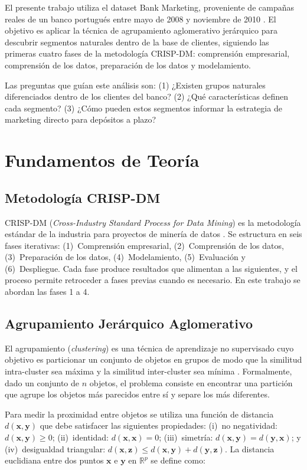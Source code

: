 \documentclass[10pt,a4paper]{article}
\begin{document}
El presente trabajo utiliza el dataset Bank Marketing, proveniente de campañas reales de un banco portugués entre mayo de 2008 y noviembre de 2010 \citep{moro2011}. El objetivo es aplicar la técnica de agrupamiento aglomerativo jerárquico para descubrir segmentos naturales dentro de la base de clientes, siguiendo las primeras cuatro fases de la metodología CRISP-DM: comprensión empresarial, comprensión de los datos, preparación de los datos y modelamiento.

Las preguntas que guían este análisis son: (1) ¿Existen grupos naturales diferenciados dentro de los clientes del banco? (2) ¿Qué características definen cada segmento? (3) ¿Cómo pueden estos segmentos informar la estrategia de marketing directo para depósitos a plazo?

\section{Fundamentos de Teoría}

\subsection{Metodología CRISP-DM}

CRISP-DM (\textit{Cross-Industry Standard Process for Data Mining}) es la metodología estándar de la industria para proyectos de minería de datos \citep{chapman2000}. Se estructura en seis fases iterativas: (1)~Comprensión empresarial, (2)~Comprensión de los datos, (3)~Preparación de los datos, (4)~Modelamiento, (5)~Evaluación y (6)~Despliegue. Cada fase produce resultados que alimentan a las siguientes, y el proceso permite retroceder a fases previas cuando es necesario. En este trabajo se abordan las fases 1 a 4.

\subsection{Agrupamiento Jerárquico Aglomerativo}

El agrupamiento (\textit{clustering}) es una técnica de aprendizaje no supervisado cuyo objetivo es particionar un conjunto de objetos en grupos de modo que la similitud intra-cluster sea máxima y la similitud inter-cluster sea mínima \citep{duda2001}. Formalmente, dado un conjunto de $n$ objetos, el problema consiste en encontrar una partición que agrupe los objetos más parecidos entre sí y separe los más diferentes.

Para medir la proximidad entre objetos se utiliza una función de distancia $d(\mathbf{x}, \mathbf{y})$ que debe satisfacer las siguientes propiedades: (i)~no negatividad: $d(\mathbf{x}, \mathbf{y}) \geq 0$; (ii)~identidad: $d(\mathbf{x}, \mathbf{x}) = 0$; (iii)~simetría: $d(\mathbf{x}, \mathbf{y}) = d(\mathbf{y}, \mathbf{x})$; y (iv)~desigualdad triangular: $d(\mathbf{x}, \mathbf{z}) \leq d(\mathbf{x}, \mathbf{y}) + d(\mathbf{y}, \mathbf{z})$. La distancia euclidiana entre dos puntos $\mathbf{x}$ e $\mathbf{y}$ en $\mathbb{R}^p$ se define como:
\end{document}
